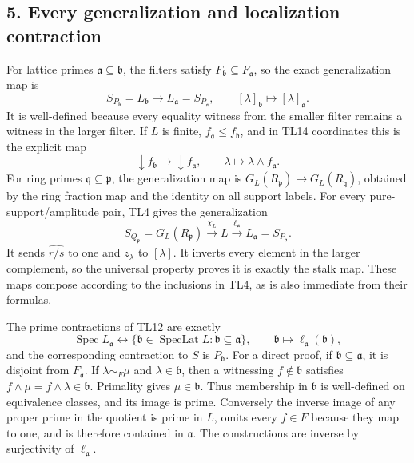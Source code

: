 \subsection{5. Every generalization and localization
contraction}\label{every-generalization-and-localization-contraction}

For lattice primes \(\mathfrak a\subseteq\mathfrak b\), the filters
satisfy \(F_{\mathfrak b}\subseteq F_{\mathfrak a}\), so the exact
generalization map is \[
 S_{P_{\mathfrak b}}=L_{\mathfrak b}\longrightarrow L_{\mathfrak a}=S_{P_{\mathfrak a}},
 \qquad[\lambda]_{\mathfrak b}\mapsto[\lambda]_{\mathfrak a}.
 \tag{TL19}
\] It is well-defined because every equality witness from the smaller
filter remains a witness in the larger filter. If \(L\) is finite,
\(f_{\mathfrak a}\le f_{\mathfrak b}\), and in TL14 coordinates this is
the explicit map \[
 \downarrow f_{\mathfrak b}\longrightarrow\downarrow f_{\mathfrak a},
 \qquad\lambda\mapsto\lambda\wedge f_{\mathfrak a}.
 \tag{TL20}
\] For ring primes \(\mathfrak q\subseteq\mathfrak p\), the
generalization map is \(G_L(R_{\mathfrak p})\to G_L(R_{\mathfrak q})\),
obtained by the ring fraction map and the identity on all support
labels. For every pure-support/amplitude pair, TL4 gives the
generalization \[
 S_{Q_{\mathfrak p}}=G_L(R_{\mathfrak p})
 \xrightarrow{\chi_L}L\xrightarrow{\ell_{\mathfrak a}}L_{\mathfrak a}=S_{P_{\mathfrak a}}.
 \tag{TL21}
\] It sends \(\widehat{r/s}\) to one and \(z_\lambda\) to \([\lambda]\).
It inverts every element in the larger complement, so the universal
property proves it is exactly the stalk map. These maps compose
according to the inclusions in TL4, as is also immediate from their
formulas.

The prime contractions of TL12 are exactly \[
 \operatorname{Spec}L_{\mathfrak a}\longleftrightarrow
 \{\mathfrak b\in\operatorname{SpecLat}L:\mathfrak b\subseteq\mathfrak a\},
 \qquad \mathfrak b\longmapsto\ell_{\mathfrak a}(\mathfrak b),
 \tag{TL22}
\] and the corresponding contraction to \(S\) is \(P_{\mathfrak b}\).
For a direct proof, if \(\mathfrak b\subseteq\mathfrak a\), it is
disjoint from \(F_{\mathfrak a}\). If \(\lambda\sim_F\mu\) and
\(\lambda\in\mathfrak b\), then a witnessing \(f\notin\mathfrak b\)
satisfies \(f\wedge\mu=f\wedge\lambda\in\mathfrak b\). Primality gives
\(\mu\in\mathfrak b\). Thus membership in \(\mathfrak b\) is
well-defined on equivalence classes, and its image is prime. Conversely
the inverse image of any proper prime in the quotient is prime in \(L\),
omits every \(f\in F\) because they map to one, and is therefore
contained in \(\mathfrak a\). The constructions are inverse by
surjectivity of \(\ell_{\mathfrak a}\).


